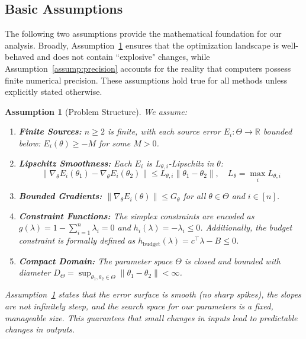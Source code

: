 \documentclass[preprint,12pt,authoryear]{elsarticle}
\newtheorem{assumption}{Assumption}
\begin{document}
\subsection{Basic Assumptions}

\noindent The following two assumptions provide the mathematical foundation for our analysis. 
Broadly, Assumption~\ref{assump:basic} ensures that the optimization landscape is well-behaved and does not contain ``explosive" changes, while Assumption~\ref{assump:precision} accounts for the reality that computers possess finite numerical precision. These assumptions hold true for all methods unless explicitly stated otherwise. 

\begin{assumption}[Problem Structure]\label{assump:basic}
We assume:
\begin{enumerate}
    \item \textbf{Finite Sources:} $n \geq 2$ is finite, with each source error $E_i: \Theta \to \mathbb{R}$ bounded below: $E_i(\theta) \geq -M$ for some $M > 0$.
    \item \textbf{Lipschitz Smoothness:} Each $E_i$ is $L_{\theta,i}$-Lipschitz in $\theta$:
    \begin{equation}
    \label{eq:lipschitz}
        \|\nabla_\theta E_i(\theta_1) - \nabla_\theta E_i(\theta_2)\| \leq L_{\theta,i}\|\theta_1 - \theta_2\|, \quad L_\theta = \max_i L_{\theta,i}
    \end{equation}
    \item \textbf{Bounded Gradients:} $\|\nabla_\theta E_i(\theta)\| \leq G_\theta$ for all $\theta \in \Theta$ and $i \in [n]$.
    \item \textbf{Constraint Functions:} The simplex constraints are encoded as $g(\lambda) = 1 - \sum_{i=1}^n \lambda_i = 0$ and $h_i(\lambda) = -\lambda_i \leq 0$. Additionally, the budget constraint is formally defined as $h_{\text{budget}}(\lambda) = c^\top \lambda - B \leq 0$.
    \item \textbf{Compact Domain:} The parameter space $\Theta$ is closed and bounded with diameter $D_\Theta = \sup_{\theta_1,\theta_2 \in \Theta}\|\theta_1 - \theta_2\| < \infty$.
\end{enumerate}
\end{assumption}

\noindent \textit{Assumption~\ref{assump:basic} states that the error surface is smooth (no sharp spikes), the slopes are not infinitely steep, and the search space for our parameters is a fixed, manageable size. This guarantees that small changes in inputs lead to predictable changes in outputs.}
\end{document}
